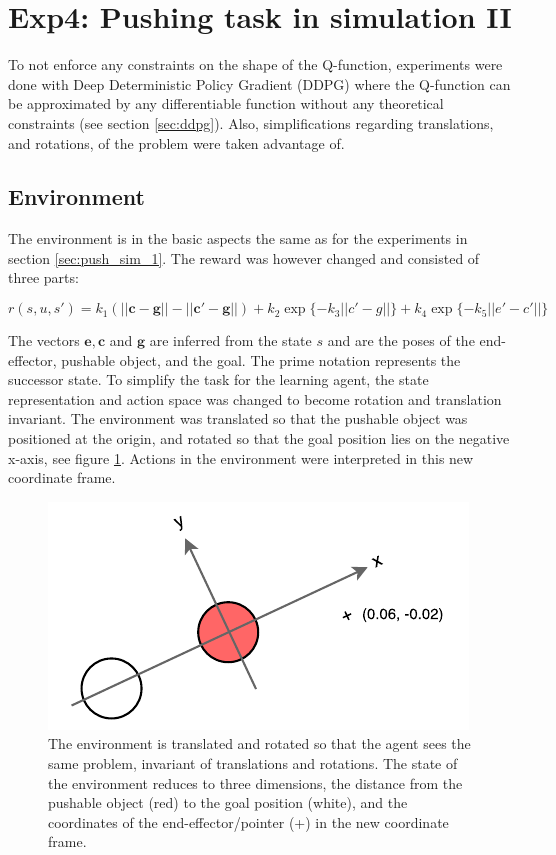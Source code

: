 \section{Exp4: Pushing task in simulation II}

To not enforce any constraints on the shape of the Q-function, experiments were
done with Deep Deterministic Policy Gradient (DDPG) where the Q-function can be
approximated by any differentiable function without any theoretical constraints
(see section \ref{sec:ddpg}). Also, simplifications regarding translations, and
rotations, of the problem were taken advantage of.

\subsection{Environment}

The environment is in the basic aspects the same as for the experiments in
section \ref{sec:push_sim_1}. The reward was however changed and consisted of
three parts:

\begin{equation}
    r(s, u, s') = k_1 \left(\mathbf{||c - g|| - ||c' - g||}\right) + k_2 \exp \lbrace -k_3 ||c' - g|| \rbrace + k_4 \exp \lbrace -k_5||e' - c'||\rbrace
\end{equation}

The vectors $\mathbf{e, c}$ and $\mathbf{g}$ are inferred from the state $s$
and are the poses of the end-effector, pushable object, and the goal. The prime
notation represents the successor state. To simplify the task for the learning
agent, the state representation and action space was changed to become rotation
and translation invariant. The environment was translated so that the pushable
object was positioned at the origin, and rotated so that the goal position lies
on the negative x-axis, see figure \ref{fig:ddpg-coordinates}. Actions in the
environment were interpreted in this new coordinate frame.

\begin{figure}[h!]
    \centering
    \includegraphics[width=0.5 \textwidth]{res/ddpg-coordinates.pdf}

    \caption{The environment is translated and rotated so that the agent sees the same
    problem, invariant of translations and rotations. The state of the environment
    reduces to three dimensions, the distance from the pushable object (red) to the
    goal position (white), and the coordinates of the end-effector/pointer (+) in
    the new coordinate frame.}

    \label{fig:ddpg-coordinates}

\end{figure}


